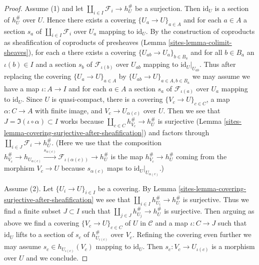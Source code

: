 \begin{proof}

Assume (1) and let $\coprod_{i \in I} \mathcal{F}_i \to h_U^\#$
be a surjection. Then $\text{id}_U$ is a section of
$h_U^\#$ over $U$. Hence there exists a covering
$\{U_a \to U\}_{a \in A}$ and for each $a \in A$
a section $s_a$ of $\coprod_{i \in I} \mathcal{F}_i$
over $U_a$ mapping to $\text{id}_U$. By the construction of coproducts as
sheafification of coproducts of presheaves
(Lemma \ref{sites-lemma-colimit-sheaves}), for each $a$
there exists a covering $\{U_{ab} \to U_a\}_{b \in B_a}$ and
for all $b \in B_a$ an $\iota(b) \in I$ and a section
$s_{b}$ of $\mathcal{F}_{\iota(b)}$ over $U_{ab}$
mapping to $\text{id}_U|_{U_{ab}}$. Thus after replacing
the covering $\{U_a \to U\}_{a \in A}$ by
$\{U_{ab} \to U\}_{a \in A, b \in B_a}$
we may assume we have a map $\iota : A \to I$
and for each $a \in A$ a section $s_a$ of $\mathcal{F}_{\iota(a)}$
over $U_a$ mapping to $\text{id}_U$.
Since $U$ is quasi-compact, there is a covering
$\{V_c \to U\}_{c \in C}$, a map $\alpha : C \to A$
with finite image, and $V_c \to U_{\alpha(c)}$ over $U$.
Then we see that $J = \Im(\iota \circ \alpha) \subset I$ works
because $\coprod_{c \in C} h_{V_c}^\# \to h_U^\#$ is surjective
(Lemma \ref{sites-lemma-covering-surjective-after-sheafification})
and factors through $\coprod_{i \in J} \mathcal{F}_i \to h_U^\#$.
(Here we use that the composition
$h_{V_c}^\# \to h_{U_{\alpha(c)}}
\xrightarrow{s_{\alpha(c)}} \mathcal{F}_{\iota(\alpha(c))} \to h_U^\#$
is the map $h_{V_c}^\# \to h_U^\#$ coming from the morphism
$V_c \to U$ because $s_{\alpha(c)}$ maps to $\text{id}_U|_{U_{\alpha(c)}}$.)

\medskip\noindent
Assume (2). Let $\{U_i \to U\}_{i \in I}$ be a covering.
By Lemma \ref{sites-lemma-covering-surjective-after-sheafification}
we see that $\coprod_{i \in I} h_{U_i}^\# \to h_U^\#$ is surjective.
Thus we find a finite subset $J \subset I$ such that
$\coprod_{j \in J} h_{U_j}^\# \to h_U^\#$ is surjective.
Then arguing as above we find a covering
$\{V_c \to U\}_{c \in C}$ of $U$ in $\mathcal{C}$
and a map $\iota : C \to J$
such that $\text{id}_U$ lifts to a section
of $s_c$ of $h_{U_{\iota(c)}}^\#$ over $V_c$.
Refining the covering even further we may assume
$s_c \in h_{U_{\iota(c)}}(V_c)$ mapping to $\text{id}_U$.
Then $s_c : V_c \to U_{\iota(c)}$ is a morphism over $U$
and we conclude.
\end{proof}

